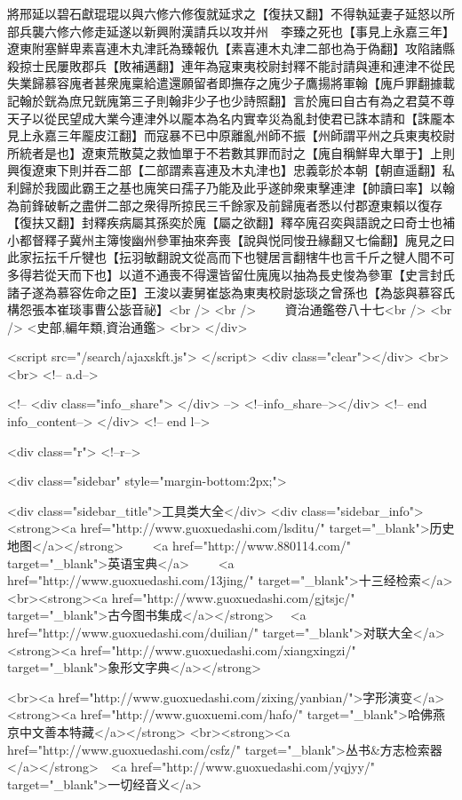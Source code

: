 將邢延以碧石獻琨琨以與六修六修復就延求之【復扶又翻】不得執延妻子延怒以所部兵襲六修六修走延遂以新興附漢請兵以攻并州　李臻之死也【事見上永嘉三年】遼東附塞鮮卑素喜連木丸津託為臻報仇【素喜連木丸津二部也為于偽翻】攻陷諸縣殺掠士民屢敗郡兵【敗補邁翻】連年為寇東夷校尉封釋不能討請與連和連津不從民失業歸慕容廆者甚衆廆稟給遣還願留者即撫存之廆少子鷹揚將軍翰【廆戶罪翻據載記翰於皝為庶兄皝廆第三子則翰非少子也少詩照翻】言於廆曰自古有為之君莫不尊天子以從民望成大業今連津外以龎本為名内實幸災為亂封使君已誅本請和【誅龎本見上永嘉三年龎皮江翻】而寇暴不已中原離亂州師不振【州師謂平州之兵東夷校尉所統者是也】遼東荒散莫之救恤單于不若數其罪而討之【廆自稱鮮卑大單于】上則興復遼東下則并吞二部【二部謂素喜連及木丸津也】忠義彰於本朝【朝直遥翻】私利歸於我國此霸王之基也廆笑曰孺子乃能及此乎遂帥衆東擊連津【帥讀曰率】以翰為前鋒破斬之盡併二部之衆得所掠民三千餘家及前歸廆者悉以付郡遼東賴以復存【復扶又翻】封釋疾病屬其孫奕於廆【屬之欲翻】釋卒廆召奕與語說之曰奇士也補小都督釋子冀州主簿悛幽州參軍抽來奔喪【說與悦同悛丑緣翻又七倫翻】廆見之曰此家抎抎千斤犍也【抎羽敏翻說文從高而下也犍居言翻犗牛也言千斤之犍人間不可多得若從天而下也】以道不通喪不得還皆留仕廆廆以抽為長史悛為參軍【史言封氏諸子遂為慕容佐命之臣】王浚以妻舅崔毖為東夷校尉毖琰之曾孫也【為毖與慕容氏構怨張本崔琰事曹公毖音祕】<br />
<br />
　　資治通鑑卷八十七<br />
<br />
<史部,編年類,資治通鑑>  <br>
   </div> 

<script src="/search/ajaxskft.js"> </script>
 <div class="clear"></div>
<br>
<br>
 <!-- a.d-->

 <!--
<div class="info_share">
</div> 
-->
 <!--info_share--></div>   <!-- end info_content-->
  </div> <!-- end l-->

<div class="r">   <!--r-->



<div class="sidebar"  style="margin-bottom:2px;">

 
<div class="sidebar_title">工具类大全</div>
<div class="sidebar_info">
<strong><a href="http://www.guoxuedashi.com/lsditu/" target="_blank">历史地图</a></strong>　　
<a href="http://www.880114.com/" target="_blank">英语宝典</a>　　
<a href="http://www.guoxuedashi.com/13jing/" target="_blank">十三经检索</a>　
<br><strong><a href="http://www.guoxuedashi.com/gjtsjc/" target="_blank">古今图书集成</a></strong>　
<a href="http://www.guoxuedashi.com/duilian/" target="_blank">对联大全</a>　<strong><a href="http://www.guoxuedashi.com/xiangxingzi/" target="_blank">象形文字典</a></strong>　

<br><a href="http://www.guoxuedashi.com/zixing/yanbian/">字形演变</a>　　<strong><a href="http://www.guoxuemi.com/hafo/" target="_blank">哈佛燕京中文善本特藏</a></strong>
<br><strong><a href="http://www.guoxuedashi.com/csfz/" target="_blank">丛书&方志检索器</a></strong>　<a href="http://www.guoxuedashi.com/yqjyy/" target="_blank">一切经音义</a>　　

